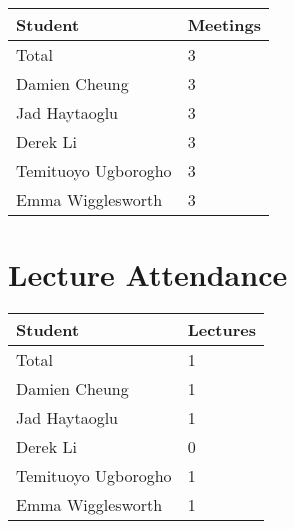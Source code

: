 \documentclass{article}
\begin{document}

\begin{table}[H]
    \centering
    \begin{tabular}{ll}
        \toprule
        \textbf{Student}    & \textbf{Meetings} \\
        \midrule
        Total               & 3                 \\
        Damien Cheung       & 3                 \\
        Jad Haytaoglu       & 3                 \\
        Derek Li            & 3                 \\
        Temituoyo Ugborogho & 3                 \\
        Emma Wigglesworth   & 3                 \\
        \bottomrule
    \end{tabular}
\end{table}


\section{Lecture Attendance}


\begin{table}[H]
    \centering
    \begin{tabular}{ll}
        \toprule
        \textbf{Student}    & \textbf{Lectures} \\
        \midrule
        Total               & 1                 \\
        Damien Cheung       & 1                 \\
        Jad Haytaoglu       & 1                 \\
        Derek Li            & 0                 \\
        Temituoyo Ugborogho & 1                 \\
        Emma Wigglesworth   & 1                 \\
        \bottomrule
    \end{tabular}
\end{table}
\end{document}

